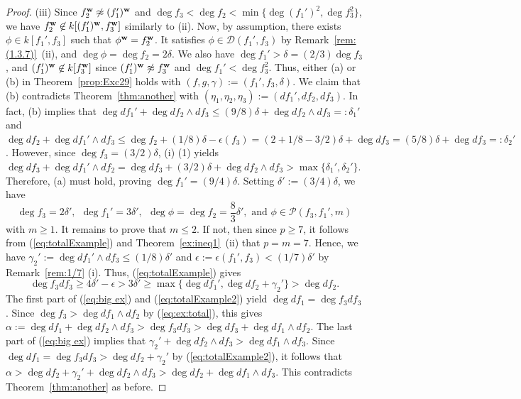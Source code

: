\documentclass{amsart}
\theoremstyle{plain}
\theoremstyle{definition}
\newcommand{\ep}{\epsilon}
\newcommand{\w}{{\bf w}}
\begin{document}
\begin{proof}
(iii) 
Since $f_2^{\w }\not\approx (f_1')^{\w }$ 
and $\deg f_3<\deg f_2<\min \{ \deg (f_1')^2,\deg f_3^2\} $, 
we have 
$f_2^{\w }\not\in k[(f_1')^{\w },f_3^{\w }]$ 
similarly to (ii). 
Now, 
by assumption, 
there exists 
$\phi \in k[f_1',f_3]$ such that $\phi ^{\w }=f_2^{\w }$. 
It satisfies 
$\phi \in \mathcal{D}(f_1',f_3)$ by Remark~\ref{rem:(1.3.7)}~(ii), 
and $\deg \phi =\deg f_2=2\delta $. 
We also have $\deg f_1'>\delta =(2/3)\deg f_3$, 
and $(f_1')^{\w }\not\in k[f_3^{\w }]$ 
since $(f_1')^{\w }\not\approx f_3^{\w }$ and $\deg f_1'<\deg f_3^2$. 
Thus, 
either (a) or (b) in Theorem~\ref{prop:Exc29} 
holds with $(f,g,\gamma ):=(f_1',f_3,\delta )$. 
We claim that (b) contradicts Theorem~\ref{thm:another} 
with $(\eta _1,\eta _2,\eta _3):=(df_1',df_2,df_3)$. 
In fact, 
(b) implies that 
$\deg df_1'+\deg df_2\wedge df_3
\le (9/8)\delta +\deg df_2\wedge df_3=:\delta _1'$ 
and 
$\deg df_2+\deg df_1'\wedge df_3
\le \deg f_2+(1/8)\delta -\ep (f_3)
=(2+1/8-3/2)\delta +\deg df_3
=(5/8)\delta +\deg df_3=:\delta _2'$. 
However, since $\deg f_3=(3/2)\delta $, 
(i) (1) yields 
$\deg df_3+\deg df_1'\wedge df_2
=\deg df_3+(3/2)\delta +\deg df_2\wedge df_3
>\max \{ \delta _1',\delta _2'\} $. 
Therefore, 
(a) must hold, proving 
$\deg f_1'=(9/4)\delta $. 
Setting $\delta ':=(3/4)\delta $, we have 
\begin{equation}\label{eq:totalExample}
\deg f_3=2\delta ',\ \ \deg f_1'=3\delta ',\ \ 
\deg \phi =\deg f_2=\frac{8}{3}\delta ',
\text{ \ and \ }
\phi \in \mathcal{P}(f_3,f_1',m) 
\end{equation}
with $m\ge 1$. 
It remains to prove that $m\le 2$. 
If not, 
then since $p\ge 7$, 
it follows from 
(\ref{eq:totalExample}) and Theorem~\ref{ex:ineq1}~(ii) that $p=m=7$. 
Hence, 
we have 
$\gamma _2':=\deg df_1'\wedge df_3\le (1/8)\delta '$ 
and $\ep:=\ep (f_1',f_3)<(1/7)\delta '$ 
by Remark~\ref{rem:1/7} (i). 
Thus, 
(\ref{eq:totalExample}) gives 
\begin{equation}\label{eq:totalExample2}
\deg f_3df_3\ge 4\delta '-\ep >3\delta '\ge 
\max \{\deg df_1',\deg df_2+\gamma _2'\} >\deg df_2. 
\end{equation}
The first part of (\ref{eq:big ex}) and (\ref{eq:totalExample2}) 
yield $\deg df_1=\deg f_3df_3$. 
Since 
$\deg f_3>\deg df_1\wedge df_2$ by (\ref{eq:ex:total}), 
this gives 
$\alpha :=\deg df_1+\deg df_2\wedge df_3
>\deg f_3df_3
>\deg df_3+\deg df_1\wedge df_2$. 
The last part of (\ref{eq:big ex}) 
implies that 
$\gamma _2'+\deg df_2\wedge df_3>\deg df_1\wedge df_3$. 
Since $\deg df_1=\deg f_3df_3>\deg df_2+\gamma _2'$ 
by (\ref{eq:totalExample2}), 
it follows that 
$\alpha >\deg df_2+\gamma _2'+\deg df_2\wedge df_3
>\deg df_2+\deg df_1\wedge df_3$. 
This contradicts Theorem~\ref{thm:another} as before. 




\end{proof}
\end{document}
